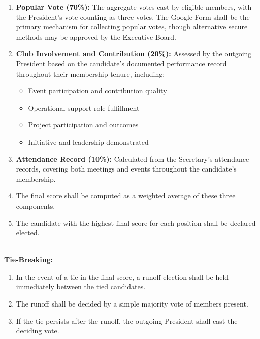 \begin{enumerate}[label=\arabic*. , leftmargin=2em, itemsep=0.3em]
    \item \textbf{Popular Vote (70\%):} The aggregate votes cast by eligible members, with the President's vote counting as three votes. The Google Form shall be the primary mechanism for collecting popular votes, though alternative secure methods may be approved by the Executive Board.
    
    \item \textbf{Club Involvement and Contribution (20\%):} Assessed by the outgoing President based on the candidate's documented performance record throughout their membership tenure, including:
    \begin{itemize}[leftmargin=1.5em, itemsep=0.2em]
        \item Event participation and contribution quality
        \item Operational support role fulfillment
        \item Project participation and outcomes
        \item Initiative and leadership demonstrated
    \end{itemize}
    
    \item \textbf{Attendance Record (10\%):} Calculated from the Secretary's attendance records, covering both meetings and events throughout the candidate's membership.
    
    \item The final score shall be computed as a weighted average of these three components.
    
    \item The candidate with the highest final score for each position shall be declared elected.
\end{enumerate}
\\
\textbf{Tie-Breaking:}
\begin{enumerate}[label=\alph*), leftmargin=2em, itemsep=0.3em]
    \item In the event of a tie in the final score, a runoff election shall be held immediately between the tied candidates.
    \item The runoff shall be decided by a simple majority vote of members present.
    \item If the tie persists after the runoff, the outgoing President shall cast the deciding vote.
\end{enumerate}

